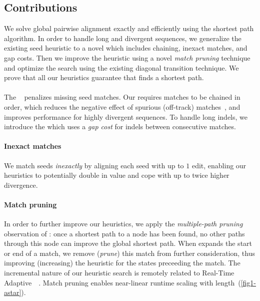 \subsection{Contributions} \label{sec:contributions}

We solve global pairwise alignment exactly and efficiently using the \A shortest
path algorithm. In order to handle long and divergent sequences, we generalize
the existing seed heuristic to a novel \csh which includes chaining, inexact
matches, and gap costs. Then we improve the heuristic using a novel \emph{match
pruning} technique and optimize the \A search using the existing diagonal
transition technique. We prove that all our heuristics guarantee that \A finds a
shortest path.

\paragraph{\Csh} The \emph{\sh}~\citep{ivanov2022fast} penalizes missing seed
matches. Our \csh requires matches to be chained in order, which reduces the
negative effect of spurious (off-track)
matches~\citep{wilbur1984context,benson2016lcsk}, and improves performance for
highly divergent sequences. To handle long indels, we introduce the \emph{\gch}
which uses a \emph{gap cost} for indels between consecutive matches.

\paragraph{Inexact matches} We match seeds \emph{inexactly} by aligning each
seed with up to $1$ edit, enabling our heuristics to potentially double in value and
cope with up to twice higher divergence.

\paragraph{Match pruning}
In order to further improve our heuristics, we apply the \emph{multiple-path pruning}
observation of \citet{poole2017artificial}: once a shortest path to a node has
been found, no other paths through this node can improve the global shortest
path. When \A expands the start or end of a match, we remove (\emph{prune}) this
match from further consideration, thus improving (increasing) the heuristic for
the states preceeding the match. The incremental nature of our heuristic search is
remotely related to Real-Time Adaptive~\A~\citep{koenig2006real}. Match pruning
enables near-linear runtime scaling with length~(\cref{fig1-astar}).

